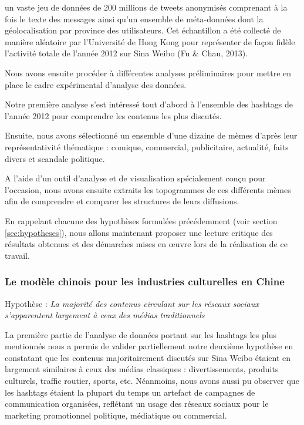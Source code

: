 un vaste jeu de données de 200 millions de tweets anonymisés comprenant à la fois le texte des messages ainsi qu{\textquoteright}un ensemble de méta-données dont la géolocalisation par province des utilisateurs. Cet échantillon a été collecté de manière aléatoire par l{\textquoteright}Université de Hong Kong pour représenter de fa\c{c}on fidèle l{\textquoteright}activité totale de l{\textquoteright}année 2012 sur Sina Weibo (Fu \& Chau, 2013). 

Nous avons ensuite procéder à différentes analyses préliminaires pour mettre en place le cadre expérimental d'analyse des données.

Notre première analyse s{\textquoteright}est intéressé tout d{\textquoteright}abord à l{\textquoteright}ensemble des hashtags de l{\textquoteright}année 2012 pour comprendre les contenus les plus discutés. 

Ensuite, nous avons sélectionné un ensemble d{\textquoteright}une dizaine de mèmes d{\textquoteright}après leur représentativité thématique : comique, commercial, publicitaire, actualité, faits divers et scandale politique. 

A l{\textquoteright}aide d{\textquoteright}un outil d{\textquoteright}analyse et de visualisation spécialement con\c{c}u pour l{\textquoteright}occasion, nous avons ensuite extraits les topogrammes de ces différents mèmes afin de comprendre et comparer les structures de leurs diffusions.


En rappelant chacune des hypothèses formulées précédemment (voir section \ref{sec:hypotheses}), nous allons maintenant proposer une lecture critique des résultats obtenues et des démarches mises en œuvre lors de la réalisation de ce travail. 

\subsubsection{Le modèle chinois pour les industries culturelles en Chine} 

Hypothèse : \textit{La majorité des contenus circulant sur les réseaux sociaux s'apparentent largement à ceux des médias traditionnels} 

La première partie de l{\textquoteright}analyse de données portant sur les hashtags les plus mentionnés nous a permis de valider partiellement notre deuxième hypothèse en constatant que les contenus majoritairement discutés sur Sina Weibo étaient en largement similaires à ceux des médias classiques : divertissements, produits culturels, traffic routier, sports, etc. Néanmoins, nous avons aussi pu observer que les hashtags étaient la plupart du temps un artefact de campagnes de communication organisées, reflétant un usage des réseaux sociaux pour le marketing promotionnel politique, médiatique ou commercial. 

